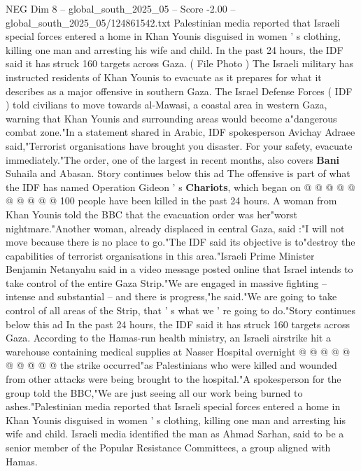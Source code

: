 \begin{textsample}{NEG Dim 8 – global\_south\_2025\_05 – Score -2.00 – global\_south\_2025\_05/124861542.txt}  \label{ex:f8_neg_011}
Palestinian media reported that Israeli special forces entered a home in Khan Younis disguised in women ' s clothing, killing one man and arresting his wife and child.
In the past 24 hours, the IDF said it has struck 160 targets across Gaza. ( File Photo ) The Israeli military has instructed residents of Khan Younis to evacuate as it prepares for what it describes as a major offensive in southern Gaza.
The Israel Defense Forces ( IDF ) told civilians to move towards al-Mawasi, a coastal area in western Gaza, warning that Khan Younis and surrounding areas would become a"dangerous combat zone."In a statement shared in Arabic, IDF spokesperson Avichay Adraee said,"Terrorist organisations have brought you disaster.
For your safety, evacuate immediately."The order, one of the largest in recent months, also covers \textbf{Bani} Suhaila and Abasan.
Story continues below this ad The offensive is part of what the IDF has named Operation Gideon ' s \textbf{Chariots}, which began on @ @ @ @ @ @ @ @ @ @ 100 people have been killed in the past 24 hours.
A woman from Khan Younis told the BBC that the evacuation order was her"worst nightmare."Another woman, already displaced in central Gaza, said :"I will not move because there is no place to go."The IDF said its objective is to"destroy the capabilities of terrorist organisations in this area."Israeli Prime Minister Benjamin Netanyahu said in a video message posted online that Israel intends to take control of the entire Gaza Strip."We are engaged in massive fighting -- intense and substantial -- and there is progress,"he said."We are going to take control of all areas of the Strip, that ' s what we ' re going to do."Story continues below this ad In the past 24 hours, the IDF said it has struck 160 targets across Gaza.
According to the Hamas-run health ministry, an Israeli airstrike hit a warehouse containing medical supplies at Nasser Hospital overnight @ @ @ @ @ @ @ @ @ @ the strike occurred"as Palestinians who were killed and wounded from other attacks were being brought to the hospital."A spokesperson for the group told the BBC,"We are just seeing all our work being burned to ashes."Palestinian media reported that Israeli special forces entered a home in Khan Younis disguised in women ' s clothing, killing one man and arresting his wife and child.
Israeli media identified the man as Ahmad Sarhan, said to be a senior member of the Popular Resistance Committees, a group aligned with Hamas.

\end{textsample}
